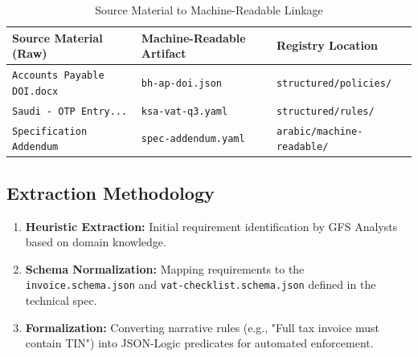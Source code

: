 \begin{table}[htbp]
\centering
\footnotesize
\caption{Source Material to Machine-Readable Linkage}
\label{tab:artifact-linkage}
\begin{tabularx}{\textwidth}{@{}l X X@{}}
\toprule
\textbf{Source Material (Raw)} & \textbf{Machine-Readable Artifact} & \textbf{Registry Location} \\
\midrule
\texttt{Accounts Payable DOI.docx} & \texttt{bh-ap-doi.json} & \texttt{structured/policies/} \\
\texttt{Saudi - OTP Entry...} & \texttt{ksa-vat-q3.yaml} & \texttt{structured/rules/} \\
\texttt{Specification Addendum} & \texttt{spec-addendum.yaml} & \texttt{arabic/machine-readable/} \\
\bottomrule
\end{tabularx}
\end{table}

\subsection{Extraction Methodology}
\begin{enumerate}
    \item \textbf{Heuristic Extraction:} Initial requirement identification by GFS Analysts based on domain knowledge.
    \item \textbf{Schema Normalization:} Mapping requirements to the \texttt{invoice.schema.json} and \texttt{vat-checklist.schema.json} defined in the technical spec.
    \item \textbf{Formalization:} Converting narrative rules (e.g., "Full tax invoice must contain TIN") into JSON-Logic predicates for automated enforcement.
\end{enumerate}
